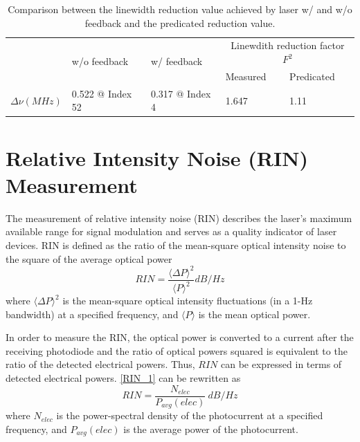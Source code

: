 \begin{table}[]
    \centering
    \caption{Comparison between the linewidth reduction value achieved by laser w/ and w/o feedback and the predicated reduction value.}
    \label{tab:linewidth_comparision}
    \begin{tabular}{@{}lllll@{}}
    \toprule
    \multirow{2}{*}{} & \multirow{2}{*}{w/o feedback} & \multirow{2}{*}{w/ feedback} & \multicolumn{2}{c}{Linewdith reduction factor $F^2$} \\
                      &                               &                              & Measured               & Predicated               \\ \midrule
    $\Delta\nu (MHz)$ & 0.522 @ Index 52              & 0.317 @ Index 4              & 1.647                     & 1.11                     \\ \bottomrule
    \end{tabular}
\end{table}

\section{Relative Intensity Noise (RIN) Measurement}\label{sec:RIN_measurement}
The measurement of relative intensity noise (RIN) describes the laser’s maximum available range for signal modulation and serves as a quality indicator of laser devices. RIN is defined as the ratio of the mean-square optical intensity noise to the square of the average optical power \cite{petermann2012laser}
\begin{equation}
    RIN=\frac{\langle \Delta P \rangle ^2}{\langle P \rangle ^2}dB/Hz
\label{RIN_1}
\end{equation}
where $\langle \Delta P \rangle ^2$ is the mean-square optical intensity fluctuations (in a 1-Hz bandwidth) at a specified frequency, and $\langle P \rangle$ is the mean optical power.

In order to measure the RIN, the optical power is converted to a current after the receiving photodiode and the ratio of optical powers squared is equivalent to the ratio of the detected electrical powers. Thus, $RIN$ can be expressed in terms of detected electrical powers. \autoref{RIN_1} can be rewritten as
\begin{equation}
    RIN=\frac{N_{elec}}{P_{avg}(elec)} \ dB/Hz
    \label{eq:RIN_2}
\end{equation}
where $N_{elec}$ is the power-spectral density of the photocurrent at a specified frequency, and $P_{avg}(elec)$ is the average power of the photocurrent.

